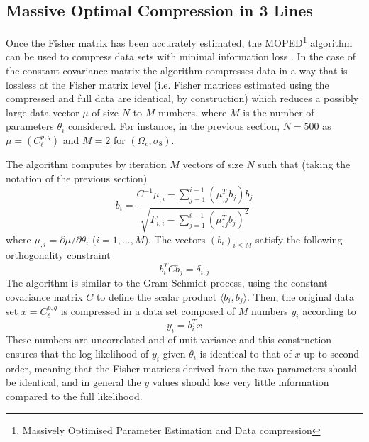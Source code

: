 \documentclass[twocolumn,twocolappendix,nofootinbib,iop]{openjournal}
\newcommand{\FrL}[1]{{\color{cyan}FL: #1}}
\begin{document}
\subsection{Massive Optimal Compression in 3 Lines}


Once the Fisher matrix has been accurately estimated, the MOPED\footnote{Massively Optimised Parameter Estimation and Data compression} algorithm can be used to compress data sets with minimal information loss \citep{2000MNRAS.317..965H,2016PhRvD..93h3525Z, 2017MNRAS.472.4244H}. In the case of the constant covariance matrix the algorithm compresses data in a way that is lossless at the Fisher matrix level (i.e. Fisher matrices estimated using the compressed and full data are identical, by construction)  which reduces a possibly large data vector $\mu$ of size $N$ to $M$ numbers, where $M$ is the number of parameters $\theta_i$ considered. For instance, in the previous section, $N=500$ as $\mu=(C_\ell^{p,q})$ and $M=2$ for $(\Omega_c,\sigma_8)$. 

The algorithm computes by iteration $M$ vectors of size $N$ such that (taking the notation of the previous section)
\begin{equation}
    b_i = \frac{C^{-1}\mu_{,i}-\sum_{j=1}^{i-1}(\mu_{,j}^T b_j)b_j}{\sqrt{F_{i,i}-\sum_{j=1}^{i-1}(\mu_{,j}^T b_j)^2}}
\label{eq:moped}
\end{equation}
where $\mu_{,i}=\partial \mu/\partial \theta_i$ ($i=1,\dots,M$). The vectors $(b_i)_{i\leq M}$ satisfy the following orthogonality constraint
\begin{equation}
    b_i^T C b_j = \delta_{i,j}
\end{equation}
The algorithm is similar to the Gram-Schmidt process, using the constant covariance matrix $C$ to define the scalar product $\langle b_i, b_j\rangle$. Then, the original data set $x=C_\ell^{p,q}$ is compressed in a data set composed of $M$ numbers $y_i$ according to
\begin{equation}
    y_i = b_i^T x
\end{equation}
These numbers are uncorrelated and of unit variance and this construction ensures that the log-likelihood of $y_i$ given  $\theta_i$ is identical to that of $x$ up to second order, meaning that the Fisher matrices derived from the two parameters should be identical, and in general the $y$ values should lose very little information compared to the full likelihood.
\end{document}
